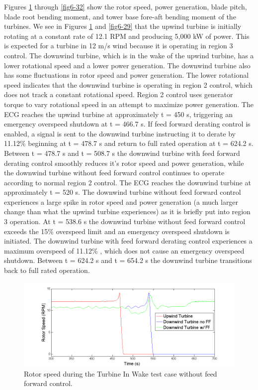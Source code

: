 Figures \ref{fig6-28} through \ref{fig6-32} show the rotor speed, power generation, blade pitch, blade root bending moment, and tower base fore-aft bending moment of the turbines. We see in Figures \ref{fig6-28} and \ref{fig6-29} that the upwind turbine is initially rotating at a constant rate of 12.1 RPM and producing 5,000 kW of power. This is expected for a turbine in 12 m/s wind because it is operating in region 3 control. The downwind turbine, which is in the wake of the upwind turbine,  has a lower rotational speed and a lower power generation. The downwind turbine also has some fluctuations in rotor speed and power generation. The lower rotational speed indicates that the downwind turbine is operating in region 2 control, which does not track a constant rotational speed. Region 2 control uses generator torque to vary rotational speed in an attempt to maximize power generation. The ECG reaches the upwind turbine at approximately t = 450 s, triggering an emergency overspeed shutdown at t = 466.7 s. If feed forward derating control is enabled, a signal is sent to the downwind turbine instructing it to derate by 11.12\% beginning at t = 478.7 s and return to full rated operation at t = 624.2 s. Between t = 478.7 s and t = 508.7 s the downwind turbine with feed forward derating control smoothly reduces it's rotor speed and power generation, while the downwind turbine without feed forward control continues to operate according to normal region 2 control. The ECG reaches the downwind turbine at approximately t = 520 s. The downwind turbine without feed forward control experiences a large spike in rotor speed and power generation (a much larger change than what the upwind turbine experiences) as it is briefly put into region 3 operation. At t = 538.6 s the downwind turbine without feed forward control exceeds the 15\% overspeed limit and an emergency overspeed shutdown is initiated. The downwind turbine with feed forward derating control experiences a maximum overspeed of 11.12\% , which does not cause an emergency overspeed shutdown. Between t = 624.2 s and t = 654.2 s the downwind turbine transitions back to full rated operation.

\begin{figure}[ht] 
	\centering
		\includegraphics[width = \linewidth]{Figures/ch6Figures/fig6-28.png}
	\caption{Rotor speed during the Turbine In Wake test case without feed forward control.}
	\label{fig6-28}
\end{figure}

